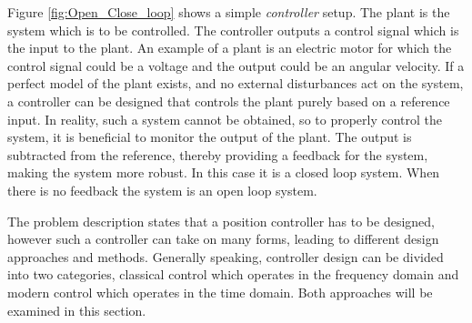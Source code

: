 \documentclass[../../main.tex]{subfiles}
\begin{document}
Figure \ref{fig:Open_Close_loop} shows a simple \textit{controller} setup.
The plant is the system which is to be controlled. The controller outputs a control signal which is the input to the plant. 
An example of a plant is an electric motor for which the control signal could be a voltage and the output could be an angular velocity.
If a perfect model of the plant exists, and no external disturbances act on the system, a controller can be designed that controls the plant purely based on a reference input. In reality, such a system cannot be obtained, so to properly control the system, it is beneficial to monitor the output of the plant. The output is subtracted from the reference, thereby providing a feedback for the system, making the system more robust. In this case it is a closed loop system. When there is no feedback the system is an open loop system.  

The problem description states that a position controller has to be designed, however such a controller can take on many forms, leading to different design approaches and methods. Generally speaking, controller design can be divided into two categories, classical control which operates in the frequency domain and modern control which operates in the time domain. Both approaches will be examined in this section.









\end{document}
